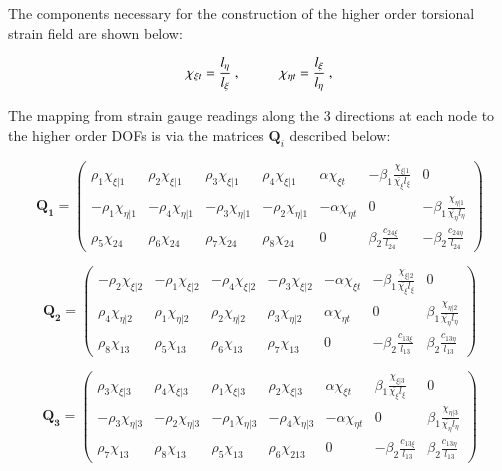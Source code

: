 The components necessary for the construction of the higher order torsional strain field are shown below:

\begin{equation} 
\chi_{\xi t} = \frac{l_\eta}{l_\xi}\ ,
\hspace{10mm}
\chi_{\eta t} = \frac{l_\xi}{l_\eta}\ ,
\label{equation13}
\end{equation}


The mapping from strain gauge readings along the 3 directions at each node to the higher order DOFs is via the matrices $\mathbf{Q}_i$ described below:


\begin{equation} 
\mathbf{Q_1} =
\begin{pmatrix}
\rho_1 \chi_{\xi | 1} & \rho_2 \chi_{\xi | 1} & \rho_3 \chi_{\xi | 1} & \rho_4 \chi_{\xi | 1} & \alpha \chi_{\xi t} & -\beta_1 \frac{\chi_{\xi | 1}}{\bar{\chi_\xi} l_\xi} & 0  \\	
-\rho_1 \chi_{\eta | 1} & -\rho_4 \chi_{\eta | 1} & -\rho_3 \chi_{\eta | 1} & -\rho_2 \chi_{\eta | 1} & -\alpha \chi_{\eta t} & 0 & -\beta_1 \frac{\chi_{\eta | 1}}{\bar{\chi_\eta} l_\eta} \\
\rho_5 \chi_{24} & \rho_6 \chi_{24} & \rho_7 \chi_{24} & \rho_8 \chi_{24} & 0 & \beta_2 \frac{c_{24 \xi}}{l_{24}} & -\beta_2 \frac{c_{24 \eta}}{l_{24}}
\end{pmatrix}		
\label{equation14}
\end{equation}

\begin{equation} 
\mathbf{Q_2} =
\begin{pmatrix}
-\rho_2 \chi_{\xi | 2} & -\rho_1 \chi_{\xi | 2} & -\rho_4 \chi_{\xi | 2} & -\rho_3 \chi_{\xi | 2} & -\alpha \chi_{\xi t} & -\beta_1 \frac{\chi_{\xi | 2}}{\bar{\chi_\xi} l_\xi} & 0  \\	
\rho_4 \chi_{\eta | 2} & \rho_1 \chi_{\eta | 2} & \rho_2 \chi_{\eta | 2} & \rho_3 \chi_{\eta | 2} & \alpha \chi_{\eta t} & 0 & \beta_1 \frac{\chi_{\eta | 2}}{\bar{\chi_\eta} l_\eta} \\
\rho_8 \chi_{13} & \rho_5 \chi_{13} & \rho_6 \chi_{13} & \rho_7 \chi_{13} & 0 & -\beta_2 \frac{c_{13 \xi}}{l_{13}} & \beta_2 \frac{c_{13 \eta}}{l_{13}}
\end{pmatrix}		
\label{equation14_2}
\end{equation}

\begin{equation} 
\mathbf{Q_3} =
\begin{pmatrix}
\rho_3 \chi_{\xi | 3} & \rho_4 \chi_{\xi | 3} & \rho_1 \chi_{\xi | 3} & \rho_2 \chi_{\xi | 3} & \alpha \chi_{\xi t} & \beta_1 \frac{\chi_{\xi | 3}}{\bar{\chi_\xi} l_\xi} & 0  \\	
-\rho_3 \chi_{\eta | 3} & -\rho_2 \chi_{\eta | 3} & -\rho_1 \chi_{\eta | 3} & -\rho_4 \chi_{\eta | 3} & -\alpha \chi_{\eta t} & 0 & \beta_1 \frac{\chi_{\eta | 3}}{\bar{\chi_\eta} l_\eta} \\
\rho_7 \chi_{13} & \rho_8 \chi_{13} & \rho_5 \chi_{13} & \rho_6 \chi_{213} & 0 & -\beta_2 \frac{c_{13 \xi}}{l_{13}} & \beta_2 \frac{c_{13 \eta}}{l_{13}}
\end{pmatrix}		
\label{equation14_3}
\end{equation}

